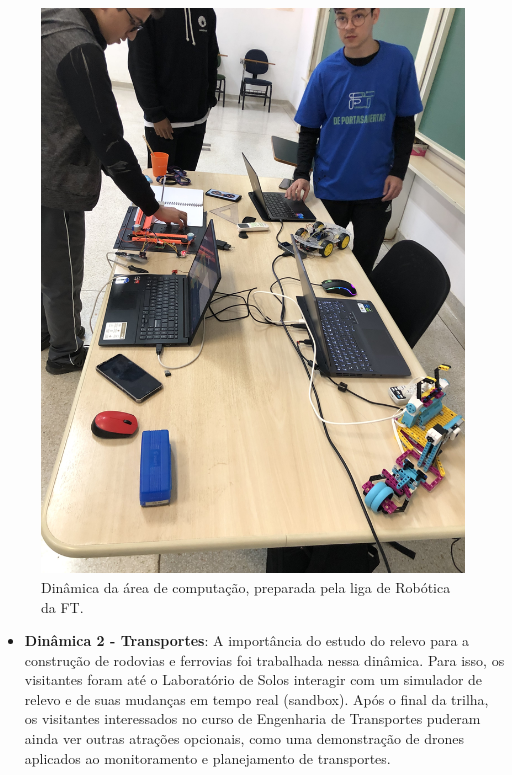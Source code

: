 \documentclass[
  letterpaper,
  DIV=11,
  numbers=noendperiod]{scrreprt}
\providecommand{\tightlist}{%
  \setlength{\itemsep}{0pt}\setlength{\parskip}{0pt}}\usepackage{longtable,booktabs,array}
\begin{document}
\begin{figure}[H]

{\centering \includegraphics[width=0.6\linewidth,height=\textheight,keepaspectratio]{planejamento/dinamica-computacao.jpg}

}

\caption{Dinâmica da área de computação, preparada pela liga de Robótica
da FT.}

\end{figure}%

\begin{itemize}
\tightlist
\item
  \textbf{Dinâmica 2 - Transportes}: A importância do estudo do relevo
  para a construção de rodovias e ferrovias foi trabalhada nessa
  dinâmica. Para isso, os visitantes foram até o Laboratório de Solos
  interagir com um simulador de relevo e de suas mudanças em tempo real
  (sandbox). Após o final da trilha, os visitantes interessados no curso
  de Engenharia de Transportes puderam ainda ver outras atrações
  opcionais, como uma demonstração de drones aplicados ao monitoramento
  e planejamento de transportes.
\end{itemize}
\end{document}

